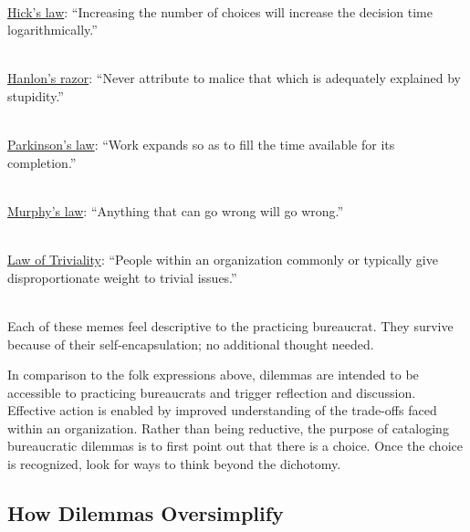 \ \\
\href{https://en.wikipedia.org/wiki/Hick\%27s_law}{Hick's law}: ``Increasing the number of choices will increase the decision time logarithmically.''

\ \\
\href{https://en.wikipedia.org/wiki/Hanlon\%27s_razor}{Hanlon's razor}: ``Never attribute to malice that which is adequately explained by stupidity.''

\ \\
\href{https://en.wikipedia.org/wiki/Parkinson\%27s_law}{Parkinson's law}: ``Work expands so as to fill the time available for its completion.''

\ \\
\href{https://en.wikipedia.org/wiki/Murphy\%27s_law}{Murphy's law}: ``Anything that can go wrong will go wrong.''

\ \\
\href{https://en.wikipedia.org/wiki/Law_of_triviality}{Law of Triviality}: ``People within an organization commonly or typically give disproportionate weight to trivial issues.''

\ \\

Each of these memes feel descriptive to the practicing bureaucrat. They survive because of their self-encapsulation; no additional thought needed.

In comparison to the folk expressions above, dilemmas are intended to be accessible to practicing bureaucrats and trigger reflection and discussion. Effective action is enabled by improved understanding of the trade-offs faced within an organization. Rather than being reductive, the purpose of cataloging bureaucratic dilemmas is to first point out that there is a choice. Once the choice is recognized, look for ways to think beyond the dichotomy.

\subsection*{How Dilemmas Oversimplify}

